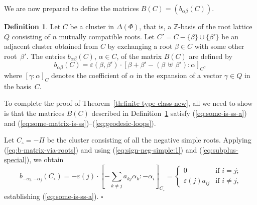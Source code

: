\documentclass[letterpaper]{amsart}
\numberwithin{equation}{section}
\theoremstyle{definition}
\newtheorem{definition}[theorem]{Definition}
\newcommand{\credit}[1]{\smallskip\noindent {\textbf{#1.\ }}}
\def\endproof{\hfill$\square$\medskip}
\def\ZZ{\mathbb{Z}}
\def\subplus{{\,\uplus\,} }
\begin{document}
We are now prepared to define the matrices $B(C)= (b_{\alpha\beta}(C))$. 
 
 
 
\begin{definition} 
\label{def:b-matrices-via-roots} 
Let $C$ be a cluster in $\Delta(\Phi)$, 
that is, a $\ZZ$-basis of the root lattice $Q$ consisting of $n$ 
mutually compatible roots. 
Let $C'=C-\{\beta\}\cup\{\beta'\}$ be an 
adjacent cluster obtained from $C$ by exchanging 
a root $\beta\in C$ with some other root~$\beta'$. 
The entries 
$b_{\alpha\beta}(C)$, $\alpha\in C$, of the matrix $B(C)$ 
are defined by 
\begin{equation} 
\label{eq:b-matrix-via-roots} 
b_{\alpha\beta}(C) = \varepsilon(\beta,\beta') \cdot 
[\beta + \beta' - (\beta \subplus \beta'): 
\alpha]_C, 
\end{equation} 
where $[\gamma:\alpha]_C$ denotes the coefficient of $\alpha$ in the expansion 
of a vector $\gamma \in Q$ in the basis~$C$. 
\end{definition} 
 
 
 
To complete the proof of Theorem~\ref{th:finite-type-class-new}, 
all we need to show is that the matrices $B(C)$ described in 
Definition~\ref{def:b-matrices-via-roots} satisfy 
(\ref{eq:some-is-ss-a}) and 
(\ref{eq:some-matrix-is-ss})--(\ref{eq:geodesic-loops}). 
 
\credit{Proof of {\rm(\ref{eq:some-is-ss-a})}} 
Let $C_\circ=-\Pi$ be the cluster consisting of all the negative simple roots. 
Applying (\ref{eq:b-matrix-via-roots}) and using 
(\ref{eq:sign-neg-simple:1}) and (\ref{eq:subplus-special}), we 
obtain 
\begin{equation} 
\label{eq:B(C_0)} 
b_{-\alpha_i,-\alpha_j}(C_\circ) = - \varepsilon (j) 
\cdot [- \sum_{k\neq j} a_{kj}\alpha_k: - \alpha_i]_{C_\circ} 
=\begin{cases} 
0 & \text{if $i=j$;} \\ %
\varepsilon(j) a_{ij} & \text{if $i\neq j$,} 
\end{cases} 
\end{equation} 
establishing 
(\ref{eq:some-is-ss-a}). 
\endproof 
 
\end{document}
